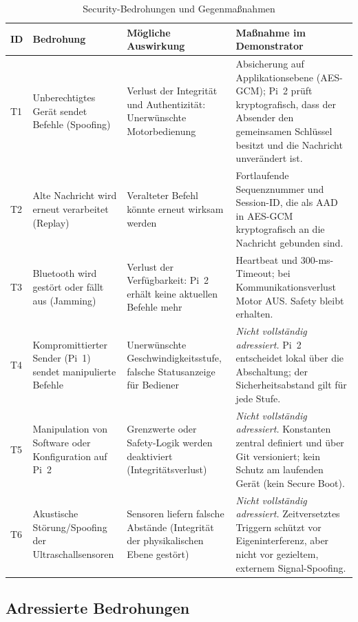 \begin{table}[H]
    \centering
    \small
    \begin{tabularx}{\textwidth}{@{}p{0.8cm}p{3.5cm}YY@{}}
        \toprule
        \textbf{ID} & \textbf{Bedrohung} & \textbf{Mögliche Auswirkung} & \textbf{Maßnahme im Demonstrator} \\
        \midrule
        T1 & Unberechtigtes Gerät sendet Befehle (Spoofing) & Verlust der Integrität und Authentizität: Unerwünschte Motorbedienung & Absicherung auf Applikationsebene (AES-GCM); Pi~2 prüft kryptografisch, dass der Absender den gemeinsamen Schlüssel besitzt und die Nachricht unverändert ist. \\
        T2 & Alte Nachricht wird erneut verarbeitet (Replay) & Veralteter Befehl könnte erneut wirksam werden & Fortlaufende Sequenznummer und Session-ID, die als AAD in AES-GCM kryptografisch an die Nachricht gebunden sind. \\
        T3 & Bluetooth wird gestört oder fällt aus (Jamming) & Verlust der Verfügbarkeit: Pi~2 erhält keine aktuellen Befehle mehr & Heartbeat und 300-ms-Timeout; bei Kommunikationsverlust Motor AUS. Safety bleibt erhalten. \\
        \midrule
        T4 & Kompromittierter Sender (Pi~1) sendet manipulierte Befehle & Unerwünschte Geschwindigkeitsstufe, falsche Statusanzeige für Bediener & \textit{Nicht vollständig adressiert.} Pi~2 entscheidet lokal über die Abschaltung; der Sicherheitsabstand gilt für jede Stufe. \\
        T5 & Manipulation von Software oder Konfiguration auf Pi~2 & Grenzwerte oder Safety-Logik werden deaktiviert (Integritätsverlust) & \textit{Nicht vollständig adressiert.} Konstanten zentral definiert und über Git versioniert; kein Schutz am laufenden Gerät (kein Secure Boot). \\
        T6 & Akustische Störung/Spoofing der Ultraschallsensoren & Sensoren liefern falsche Abstände (Integrität der physikalischen Ebene gestört) & \textit{Nicht vollständig adressiert.} Zeitversetztes Triggern schützt vor Eigeninterferenz, aber nicht vor gezieltem, externem Signal-Spoofing. \\
        \bottomrule
    \end{tabularx}
    \caption{Security-Bedrohungen und Gegenmaßnahmen}
    \label{tab:security-threats}
\end{table}

\subsection{Adressierte Bedrohungen}
\label{subsec:security-addressed}

